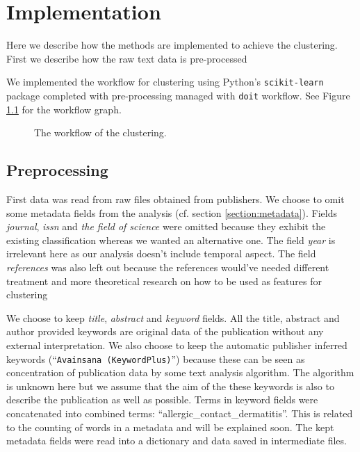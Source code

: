\chapter{Implementation}
\label{chapter:implementation}


Here we describe how the methods are implemented to achieve the 
clustering. First we describe how the raw text data is 
pre-processed 

We implemented the workflow for clustering using Python's 
\texttt{scikit-learn} package completed with 
pre-processing managed with \texttt{doit} workflow. See Figure 
\ref{fig:wf} for the workflow graph.

\begin{figure}[ht]
  \begin{center}    
    
    \caption{The workflow of the clustering.}
    \label{fig:wf}
  \end{center}
\end{figure}

\section{Preprocessing}
\label{sec:impl_preproc}
First data was read from raw files obtained from publishers. 
We choose to omit some metadata fields from the analysis (cf. 
section \ref{section:metadata}). Fields \emph{journal}, 
\emph{issn} and \emph{the field of science} were omitted because 
they exhibit the existing classification whereas we wanted an 
alternative one. The field \emph{year} is irrelevant here as our 
analysis doesn't include temporal aspect. The field 
\emph{references} was also left out because the references 
would've needed different treatment and more theoretical research 
on how to be used as features for clustering 

We choose to keep \emph{title}, \emph{abstract} and 
\emph{keyword} fields. All the title, abstract and author 
provided keywords are original data of the publication without 
any external interpretation. We also choose to keep the automatic 
publisher inferred keywords (``\texttt{Avainsana 
(KeywordPlus)}'') because these can be seen as concentration of 
publication data by some text analysis algorithm. The algorithm is 
unknown here but we assume that the aim of the these keywords is 
also to describe the publication as well as possible. 
Terms in keyword fields were concatenated into combined terms: 
``allergic\_contact\_dermatitis''. This is related to the counting 
of words in a metadata and will be explained soon. The kept 
metadata fields were read into a dictionary and data saved in 
intermediate files.

